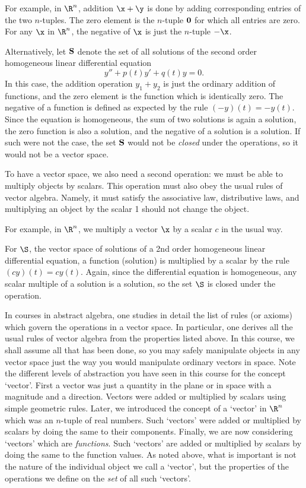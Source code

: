 For  example, in $\R^n$, addition $\x + \y$
 is  done by
adding corresponding entries of the two $n$-tuples.  The
zero element is the $n$-tuple $\bold 0$ for which all entries are
zero.  For any $\x$ in $\R^n$, the negative of $\x$ is just
the $n$-tuple $-\x$.

Alternatively, let $\bold S$ denote the set of all solutions of
the second order homogeneous linear differential equation
$$
y'' + p(t)y' + q(t)y = 0.
$$
In this case, the addition operation $y_1 + y_2$ is just the
ordinary addition of functions, and the zero element is the
function which is identically zero.   The negative of a function
is defined as expected by the rule $(-y)(t) = -y(t)$. 
Since the equation is homogeneous, the sum of two solutions is
again a solution, the zero function is also a solution, and
the negative of a solution is a solution.
If such were not the case, the set $\bold S$ would not be
{\it closed\/} under the operations, so it would not be a
vector space.

To have a vector space, we also need a second operation:
we must be able to multiply objects by scalars.   This operation must also
obey the usual rules of vector algebra.  Namely, it must satisfy
the associative law, distributive laws, and multiplying an object by the
scalar 1 should not change the object.
 
For example, in $\R^n$, we multiply a vector $\x$ by a scalar
$c$ in the usual way.

For $\S$, the vector space of solutions of a 2nd order homogeneous
linear differential equation, 
 a function (solution) is multiplied by a
scalar by the rule $(cy)(t) = cy(t)$.  Again, since the differential equation
is homogeneous, any scalar multiple of a solution is a solution,
so the set $\S$ is closed under the operation. 

In courses in abstract algebra, one studies in detail the list of
rules (or axioms) which govern the operations in a vector space.
In particular, one derives all the usual rules of vector algebra
from the properties listed above.  In this course, we shall assume
all that has been done, so you may safely manipulate objects
in any vector space just the way you would manipulate ordinary
vectors in space.   Note the different levels of abstraction
you have seen in this course for the concept `vector'.   First
a vector was just a quantity in the plane or in space with a magnitude
and a direction.   Vectors were added or multiplied by scalars using
simple geometric rules.  Later, we introduced the concept of a
`vector' in $\R^n$ which was an $n$-tuple of real numbers.  Such
`vectors' were added or multiplied by scalars by doing the same to
their components.  Finally, we are now considering `vectors' which
are {\it functions}.  Such `vectors' are added or multiplied by
scalars by doing the same to the function values.   As noted above,
what is important is not the nature of the individual object
we call a `vector', but the properties of the operations we define
on the {\it set\/} of all such `vectors'.
%

